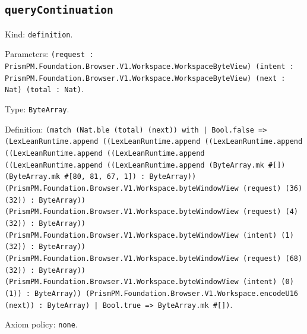 \documentclass[11pt]{article}
\begin{document}
\subsection*{\texttt{queryContinuation}}
\noindent Kind: \texttt{definition}.\par
\noindent Parameters: \texttt{(request : PrismPM.Foundation.Browser.V1.Workspace.WorkspaceByteView) (intent : PrismPM.Foundation.Browser.V1.Workspace.WorkspaceByteView) (next : Nat) (total : Nat)}.\par
\noindent Type: \texttt{ByteArray}.\par
\noindent Definition: \texttt{(match (Nat.ble (total) (next)) with | Bool.false => (LexLeanRuntime.append ((LexLeanRuntime.append ((LexLeanRuntime.append ((LexLeanRuntime.append ((LexLeanRuntime.append ((LexLeanRuntime.append ((LexLeanRuntime.append (ByteArray.mk \#[]) (ByteArray.mk \#[80, 81, 67, 1]) : ByteArray)) (PrismPM.Foundation.Browser.V1.Workspace.byteWindowView (request) (36) (32)) : ByteArray)) (PrismPM.Foundation.Browser.V1.Workspace.byteWindowView (request) (4) (32)) : ByteArray)) (PrismPM.Foundation.Browser.V1.Workspace.byteWindowView (intent) (1) (32)) : ByteArray)) (PrismPM.Foundation.Browser.V1.Workspace.byteWindowView (request) (68) (32)) : ByteArray)) (PrismPM.Foundation.Browser.V1.Workspace.byteWindowView (intent) (0) (1)) : ByteArray)) (PrismPM.Foundation.Browser.V1.Workspace.encodeU16 (next)) : ByteArray) | Bool.true => ByteArray.mk \#[])}.\par
\noindent Axiom policy: \texttt{none}.\par
\end{document}
